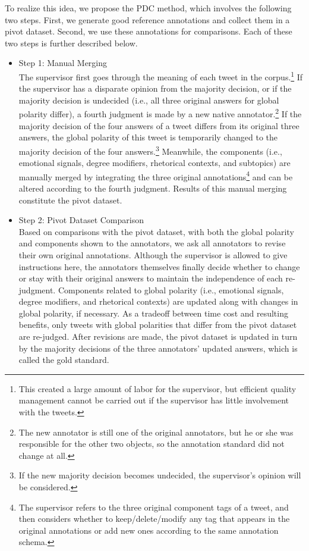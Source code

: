 \documentclass[english]{jnlp_1.4}
\begin{document}
To realize this idea, we propose the PDC method, which involves the following two steps. First, we generate good reference annotations and collect them in a pivot dataset. Second, we use these annotations for comparisons. Each of these two steps is further described below.
\begin{itemize}
\item Step 1: Manual Merging\\
The supervisor first goes through the meaning of each tweet in the corpus.\footnote{This created a large amount of labor for the supervisor, but efficient quality management cannot be carried out if the supervisor has little involvement with the tweets.} If the supervisor has a disparate opinion from the majority decision, or if the majority decision is undecided (i.e., all three original answers for global polarity differ), a fourth judgment is made by a new native annotator.\footnote{The new annotator is still one of the original annotators, but he or she was responsible for the other two objects, so the annotation standard did not change at all.} If the majority decision of the four answers of a tweet differs from its original three answers, the global polarity of this tweet is temporarily changed to the majority decision of the four answers.\footnote{If the new majority decision becomes undecided, the supervisor's opinion will be considered.} Meanwhile, the components (i.e., emotional signals, degree modifiers, rhetorical contexts, and subtopics) are manually merged by integrating the three original annotations\footnote{The supervisor refers to the three original component tags of a tweet, and then considers whether to keep/delete/modify any tag that appears in the original annotations or add new ones according to the same annotation schema.} and can be altered according to the fourth judgment. Results of this manual merging constitute the pivot dataset.
\item Step 2: Pivot Dataset Comparison\\
Based on comparisons with the pivot dataset, with both the global polarity and components shown to the annotators, we ask all annotators to revise their own original annotations. Although the supervisor is allowed to give instructions here, the annotators themselves finally decide whether to change or stay with their original answers to maintain the independence of each re-judgment. Components related to global polarity (i.e., emotional signals, degree modifiers, and rhetorical contexts) are updated along with changes in global polarity, if necessary. As a tradeoff between time cost and resulting benefits, only tweets with global polarities that differ from the pivot dataset are re-judged. After revisions are made, the pivot dataset is updated in turn by the majority decisions of the three annotators' updated answers, which is called the gold standard.
\end{itemize}
\end{document}
